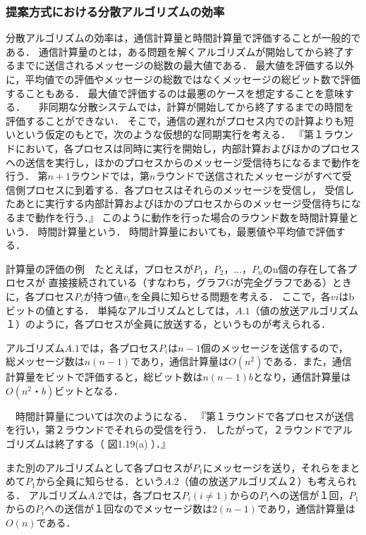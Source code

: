 \documentclass[a4paper,12pt]{jsarticle}
\begin{document}
      \subsubsection{提案方式における分散アルゴリズムの効率}%
分散アルゴリズムの効率は，通信計算量と時間計算量で評価することが一般的である．
通信計算量のとは，ある問題を解くアルゴリズムが開始してから終了するまでに送信されるメッセージの総数の最大値である．
最大値を評価する以外に，平均値での評価やメッセージの総数ではなくメッセージの総ビット数で評価することもある．
最大値で評価するのは最悪のケースを想定することを意味する．
　非同期な分散システムでは，計算が開始してから終了するまでの時間を評価することができない．
そこで，通信の遅れがプロセス内での計算よりも短いという仮定のもとで，次のような仮想的な同期実行を考える．
『第１ラウンドにおいて，各プロセスは同時に実行を開始し，内部計算およびほかのプロセスへの送信を実行し，ほかのプロセスからのメッセージ受信待ちになるまで動作を行う．
第$n + 1$ラウンドでは，第$n$ラウンドで送信されたメッセージがすべて受信側プロセスに到着する．各プロセスはそれらのメッセージを受信し，
受信したあとに実行する内部計算およびほかのプロセスからのメッセージ受信待ちになるまで動作を行う．』
このように動作を行った場合のラウンド数を時間計算量という．
時間計算量という．
時間計算量においても，最悪値や平均値で評価する．

計算量の評価の例　たとえば，プロセスが$P_1$，$P_2$，...，$P_n$のn個の存在して各プロセスが
直接接続されている（すなわち，グラフGが完全グラフである）ときに，各プロセス$P_i$が持つ値$v_i$を全員に知らせる問題を考える．
ここで，各$vi$はbビットの値とする．
単純なアルゴリズムとしては，$A.1$（値の放送アルゴリズム１）のように，各プロセスが全員に放送する，というものが考えられる．

アルゴリズム$A.1$では，各プロセス$P_i$は$n-1$個のメッセージを送信するので，
総メッセージ数は$n(n - 1)$であり，通信計算量は$O(n^2)$である．また，通信計算量をビットで評価すると，総ビット数は$n(n-1)b$となり，通信計算量は$O(n^2・b)$ビットとなる．

　時間計算量については次のようになる．
『第１ラウンドで各プロセスが送信を行い，第２ラウンドでそれらの受信を行う．
したがって，２ラウンドでアルゴリズムは終了する（ 図1.19(a) ）．』

また別のアルゴリズムとして各プロセスが$P_1$にメッセージを送り，それらをまとめて$P_1$から全員に知らせる．という$A.2$（値の放送アルゴリズム２）も考えられる．
アルゴリズム$A.2$では，各プロセス$P_i(i≠1)$からの$P_1$への送信が１回，$P_1$からの$P_i$への送信が１回なのでメッセージ数は$2(n-1)$であり，通信計算量は$O(n)$である．
\end{document}
